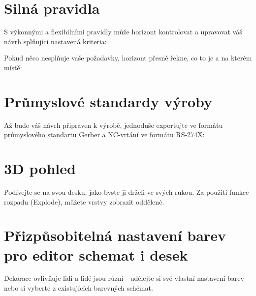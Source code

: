 \documentclass[letterpaper,10pt,czech]{sphinxmanual}
\begin{document}
\noindent{}


\section{Silná pravidla}
\label{\detokenize{feature-overview:silna-pravidla}}
S výkonnými a flexibilními pravidly může horizont kontrolovat a upravovat váš
návrh splňující nastavená kriteria:

\noindent{}

Pokud něco nesplňuje vaše požadavky, horizont přesně řekne, co to je a
na kterém místě:

\noindent{}


\section{Průmyslové standardy výroby}
\label{\detokenize{feature-overview:prumyslove-standardy-vyroby}}
Až bude váš návrh připraven k výrobě, jednoduše exportujte ve formátu
průmyslového standartu Gerber a NC-vrtání ve formátu RS-274X:

\noindent{}


\section{3D pohled}
\label{\detokenize{feature-overview:d-pohled}}
Podívejte se na svou desku, jako byste ji drželi ve svých rukou. Za použití funkce rozpadu (Explode), můžete vrstvy zobrazit oddělené.

\noindent{}


\section{Přizpůsobitelná nastavení barev pro editor schemat i desek}
\label{\detokenize{feature-overview:prizpusobitelna-nastaveni-barev-pro-editor-schemat-i-desek}}
Dekorace ovlivňuje lidi a lidé jsou různí - udělejte si své vlastní nastavení barev nebo si vyberte z existujících barevných schémat.

\noindent{}

\noindent{}

\noindent{}

\noindent{}
\end{document}
